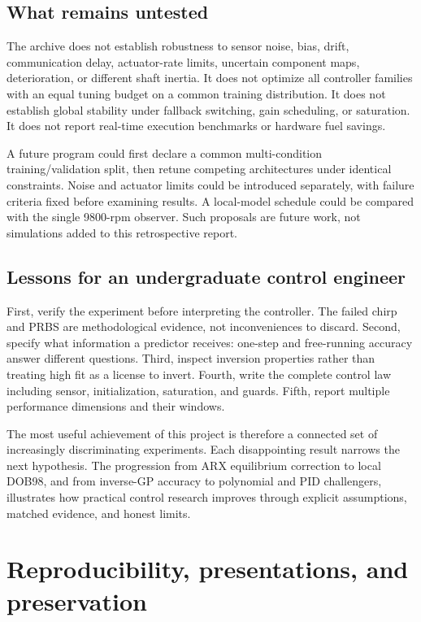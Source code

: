 \section{What remains untested}
The archive does not establish robustness to sensor noise, bias, drift, communication delay, actuator-rate limits, uncertain component maps, deterioration, or different shaft inertia. It does not optimize all controller families with an equal tuning budget on a common training distribution. It does not establish global stability under fallback switching, gain scheduling, or saturation. It does not report real-time execution benchmarks or hardware fuel savings.

A future program could first declare a common multi-condition training/validation split, then retune competing architectures under identical constraints. Noise and actuator limits could be introduced separately, with failure criteria fixed before examining results. A local-model schedule could be compared with the single 9800-rpm observer. Such proposals are future work, not simulations added to this retrospective report.

\section{Lessons for an undergraduate control engineer}
First, verify the experiment before interpreting the controller. The failed chirp and PRBS are methodological evidence, not inconveniences to discard. Second, specify what information a predictor receives: one-step and free-running accuracy answer different questions. Third, inspect inversion properties rather than treating high fit as a license to invert. Fourth, write the complete control law including sensor, initialization, saturation, and guards. Fifth, report multiple performance dimensions and their windows.

The most useful achievement of this project is therefore a connected set of increasingly discriminating experiments. Each disappointing result narrows the next hypothesis. The progression from ARX equilibrium correction to local DOB98, and from inverse-GP accuracy to polynomial and PID challengers, illustrates how practical control research improves through explicit assumptions, matched evidence, and honest limits.

\chapter{Reproducibility, presentations, and preservation}
